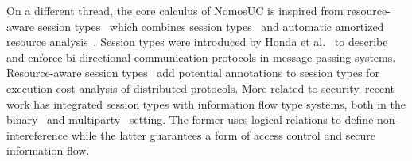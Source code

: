 On a different thread, the core calculus of NomosUC is inspired from resource-aware session types~\cite{das2018work} which combines
session types~\cite{HondaCONCUR1993, HondaESOP1998, HondaPOPL2008,caires2010session, ToninhoESOP2013, PfenningFOSSACS2015,
WadlerICFP2012} and automatic amortized resource analysis~\cite{Hofmann03AARA,HoffmannW15}.
Session types were introduced by Honda et al.~\cite{HondaCONCUR1993} to describe and enforce bi-directional communication protocols
in message-passing systems.
Resource-aware session types~\cite{das2018work} add potential annotations to session types for execution cost analysis
of distributed protocols.
More related to security, recent work has integrated session types with information flow type systems, both
in the binary~\cite{Derakhshan21LICS} and multiparty~\cite{Capecchi10CONCUR} setting.
The former uses logical relations to define non-intereference while the latter
guarantees a form of access control and secure information flow.

%

